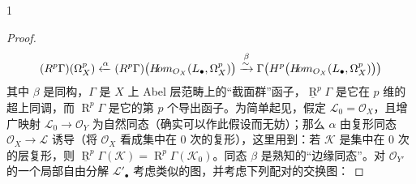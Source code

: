 \begin{theorem}{1}
\begin{proof}
\begingroup\footnotesize\[         \begin{gathered}
(\operatorname{R}^p\Gamma)(\Omega_X^p)
\xleftarrow{\alpha}
(\underline{\operatorname{R}}^p\Gamma)
\bigl(\mathscr{H}\kern-2.5pt\mathit{om}_{\mathcal{O}_X}(\mathscr{L}_\bullet,\Omega_X^p)\bigr)
\overset{\beta}{\xrightarrow{\sim}}
\Gamma\bigl(\operatorname{H}^p\bigl(\mathscr{H}\kern-2.5pt\mathit{om}_{\mathcal{O}_X}(\mathscr{L}_\bullet,\Omega_X^p)\bigr)\bigr)
\end{gathered}       \]\endgroup{}
其中 \(\beta \) 是同构，\(\Gamma \) 是 \(X\) 上 Abel 层范畴上的“截面群”函子，\(\underline {\operatorname {R}}^p\Gamma \) 是它在 \(p\) 维的超上同调，而 \(\operatorname {R}^p\Gamma \) 是它的第 \(p\) 个导出函子。为简单起见，假定 \(\mathscr {L}_0=\mathcal {O}_X\)，且增广映射 \(\mathscr {L}_0\to \mathcal {O}_Y\) 为自然同态（确实可以作此假设而无妨）；那么 \(\alpha \) 由复形同态 \(\mathcal {O}_X\to \mathscr {L}\) 诱导（将 \(\mathcal {O}_X\) 看成集中在 \(0\) 次的复形），这里用到：若 \(\mathscr {K}\) 是集中在 \(0\) 次的层复形，则 \(\underline {\operatorname {R}}^p\Gamma (\mathscr {K})=\operatorname {R}^p\Gamma (\mathscr {K}_0)\)。同态 \(\beta \) 是熟知的“边缘同态”。对 \(\mathcal {O}_{Y'}\) 的一个局部自由分解 \(\mathscr {L}'_\bullet \) 考虑类似的图，并考虑下列配对的交换图：

\end{proof}
\end{theorem}
